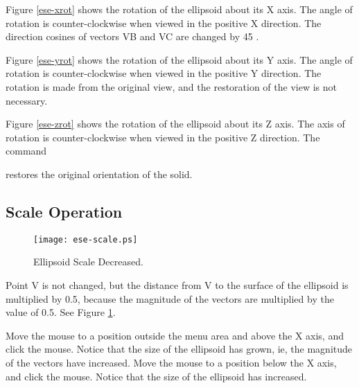 Figure \ref{ese-xrot} shows the rotation of the ellipsoid about its X axis.
The angle of rotation is counter-clockwise when viewed in the positive X
direction.  The direction cosines of vectors VB and VC are changed by 45 .


Figure \ref{ese-yrot} shows the rotation of the ellipsoid about its Y axis.
The angle
of rotation is counter-clockwise when viewed in the positive Y direction.  The
rotation is made from the original view, and the restoration of the view is
not necessary.


Figure \ref{ese-zrot} shows the rotation of the ellipsoid about its Z axis.
The axis
of rotation is counter-clockwise when viewed in the positive Z direction.
The command


restores the original orientation of the solid.

\subsection{Scale Operation}

\begin{figure}
\centering \texttt{[image: ese-scale.ps]}
\caption{Ellipsoid Scale Decreased.}
\label{ese-scale}
\end{figure}


Point V is not changed,
but the distance from V to the surface of the ellipsoid is multiplied by 0.5,
because the magnitude of the vectors are multiplied by the value of 0.5.
See Figure \ref{ese-scale}.

Move the mouse to a position outside the menu area and above the X axis,
and click the mouse.
Notice that the size of the ellipsoid has grown, ie,
the magnitude of the vectors have increased.
Move the mouse to a position below the X axis, and click the mouse.
Notice that the size of the ellipsoid has increased.

